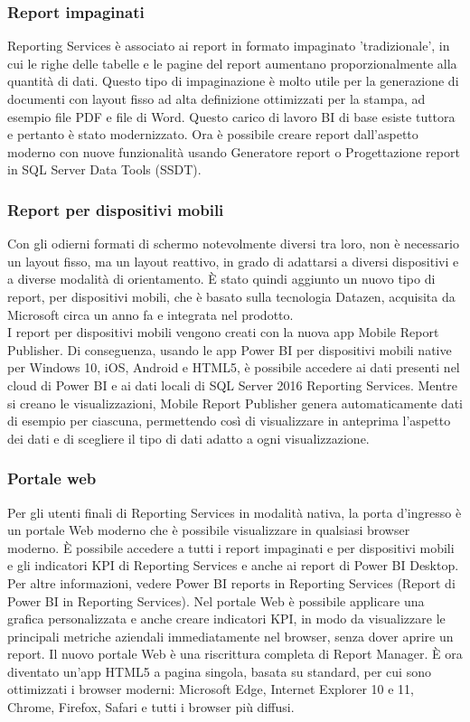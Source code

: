 \documentclass[12pt, a4paper, oneside]{book}
\begin{document}
\subsubsection{Report impaginati}
Reporting Services è associato ai report in formato impaginato 'tradizionale', in cui le righe delle tabelle e le pagine del report aumentano proporzionalmente alla quantità di dati. Questo tipo di impaginazione è molto utile per la generazione di documenti con layout fisso ad alta definizione ottimizzati per la stampa, ad esempio file PDF e file di Word.
Questo carico di lavoro BI di base esiste tuttora e pertanto è stato modernizzato. Ora è possibile creare report dall'aspetto moderno con nuove funzionalità usando Generatore report o Progettazione report in SQL Server Data Tools (SSDT).
\subsubsection{Report per dispositivi mobili}
Con gli odierni formati di schermo notevolmente diversi tra loro, non è necessario un layout fisso, ma un layout reattivo, in grado di adattarsi a diversi dispositivi e a diverse modalità di orientamento. È stato quindi aggiunto un nuovo tipo di report, per dispositivi mobili, che è basato sulla tecnologia Datazen, acquisita da Microsoft circa un anno fa e integrata nel prodotto. 
\\I report per dispositivi mobili vengono creati con la nuova app Mobile Report Publisher. Di conseguenza, usando le app Power BI per dispositivi mobili native per Windows 10, iOS, Android e HTML5, è possibile accedere ai dati presenti nel cloud di Power BI e ai dati locali di SQL Server 2016 Reporting Services. Mentre si creano le visualizzazioni, Mobile Report Publisher genera automaticamente dati di esempio per ciascuna, permettendo così di visualizzare in anteprima l'aspetto dei dati e di scegliere il tipo di dati adatto a ogni visualizzazione.
\subsubsection{Portale web}
Per gli utenti finali di Reporting Services in modalità nativa, la porta d'ingresso è un portale Web moderno che è possibile visualizzare in qualsiasi browser moderno. È possibile accedere a tutti i report impaginati e per dispositivi mobili e gli indicatori KPI di Reporting Services e anche ai report di Power BI Desktop. Per altre informazioni, vedere Power BI reports in Reporting Services (Report di Power BI in Reporting Services). Nel portale Web è possibile applicare una grafica personalizzata e anche creare indicatori KPI, in modo da visualizzare le principali metriche aziendali immediatamente nel browser, senza dover aprire un report. Il nuovo portale Web è una riscrittura completa di Report Manager. È ora diventato un'app HTML5 a pagina singola, basata su standard, per cui sono ottimizzati i browser moderni: Microsoft Edge, Internet Explorer 10 e 11, Chrome, Firefox, Safari e tutti i browser più diffusi.
\end{document}
